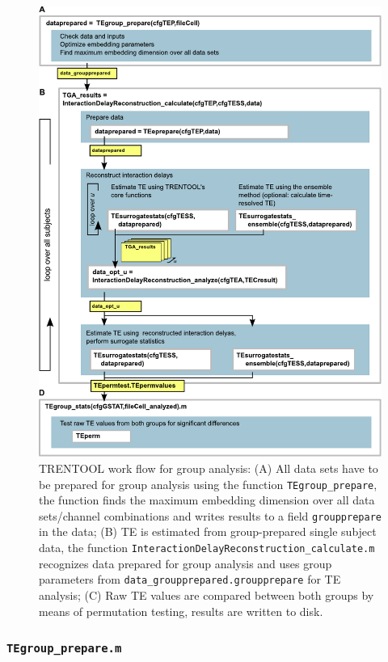 \documentclass[a4paper,10pt]{article}
\begin{document}
\begin{figure}[H]	
	\centering	
 		\includegraphics[scale=0.90]{figures/TRENTOOL3_groupanalysis.pdf}
	\caption[TRENTOOL work flow for group analysis]{TRENTOOL work flow for group analysis: 
	(A) All data sets have to be prepared for group analysis using the function \texttt{TEgroup\_prepare}, the function finds the maximum embedding dimension over all data sets/channel combinations and writes results to a field \texttt{groupprepare} in the data;
	(B) TE is estimated from group-prepared single subject data, the function  \texttt{InteractionDelayReconstruction\_calculate.m} recognizes data prepared for group analysis and uses group parameters from \texttt{data\_groupprepared.groupprepare} for TE analysis;
	(C) Raw TE values are compared between both groups by means of permutation testing, results are written to disk.
	}
	\label{fig:groupanalysis}
\end{figure} 


\subsubsection{\texttt{TEgroup\_prepare.m}}
\end{document}
